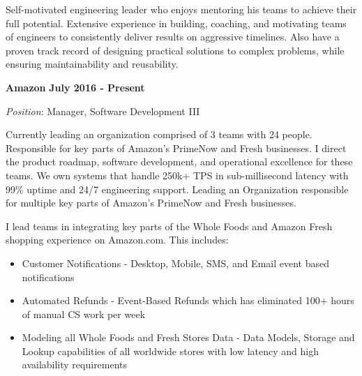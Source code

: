 \documentclass{article}
\begin{document}
\par
\vspace{2\baselineskip}
\par
Self-motivated engineering leader who enjoys mentoring his teams to achieve their full potential. Extensive experience in building, coaching, and motivating teams of engineers to consistently deliver results on aggressive timelines. Also have a proven track record of designing practical solutions to complex problems, while ensuring maintainability and reusability.
\par
\vspace{\baselineskip}
\vspace{\baselineskip}
{\bf Amazon}
\hfill {\bf July 2016 - Present}
\vspace{.03in}
\par
{\it Position}: Manager, Software Development III
\vspace{\baselineskip}
\par
Currently leading an organization comprised of 3 teams with 24 people. Responsible for key parts of Amazon’s PrimeNow and Fresh businesses. I direct the product roadmap, software development, and operational excellence for these teams. We own systems that handle 250k+ TPS in sub-millisecond latency with 99\% uptime and 24/7 engineering support.
Leading an Organization responsible for multiple key parts of Amazon's PrimeNow and Fresh businesses.  
\par
\vspace{\baselineskip}
I lead teams in integrating key parts of the Whole Foods and Amazon Fresh shopping experience on Amazon.com. This includes:
\begin{small}
\begin{itemize}
  \item Customer Notifications - Desktop, Mobile, SMS, and Email event based notifications
  \item Automated Refunds - Event-Based Refunds which has eliminated 100+ hours of manual CS work per week
  \item Modeling all Whole Foods and Fresh Stores Data - Data Models, Storage and Lookup capabilities of all worldwide stores with low latency and high availability requirements
\end{itemize}
\end{small}
\end{document}
